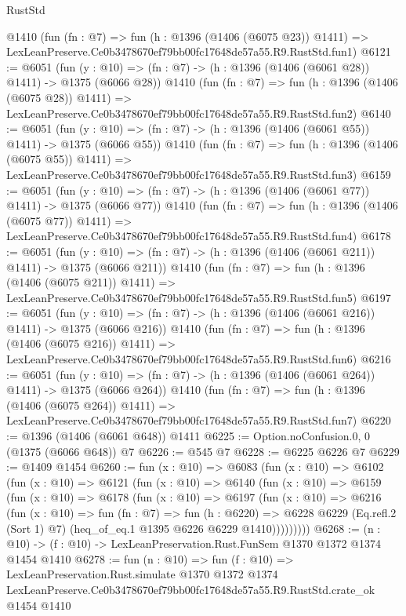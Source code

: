 \begin{lexlean}{RustStd}
\begin{coremodule}
    @1410
    (fun (fn : @7) =>
    fun (h : @1396 (@1406 (@6075 @23)) @1411) =>
    LexLeanPreserve.Ce0b3478670ef79bb00fc17648de57a55.R9.RustStd.fun1)
@6121 := @6051
    (fun (y : @10) => (fn : @7) -> (h : @1396 (@1406 (@6061 @28)) @1411) -> @1375 (@6066 @28))
    @1410
    (fun (fn : @7) =>
    fun (h : @1396 (@1406 (@6075 @28)) @1411) =>
    LexLeanPreserve.Ce0b3478670ef79bb00fc17648de57a55.R9.RustStd.fun2)
@6140 := @6051
    (fun (y : @10) => (fn : @7) -> (h : @1396 (@1406 (@6061 @55)) @1411) -> @1375 (@6066 @55))
    @1410
    (fun (fn : @7) =>
    fun (h : @1396 (@1406 (@6075 @55)) @1411) =>
    LexLeanPreserve.Ce0b3478670ef79bb00fc17648de57a55.R9.RustStd.fun3)
@6159 := @6051
    (fun (y : @10) => (fn : @7) -> (h : @1396 (@1406 (@6061 @77)) @1411) -> @1375 (@6066 @77))
    @1410
    (fun (fn : @7) =>
    fun (h : @1396 (@1406 (@6075 @77)) @1411) =>
    LexLeanPreserve.Ce0b3478670ef79bb00fc17648de57a55.R9.RustStd.fun4)
@6178 := @6051
    (fun (y : @10) => (fn : @7) -> (h : @1396 (@1406 (@6061 @211)) @1411) -> @1375 (@6066 @211))
    @1410
    (fun (fn : @7) =>
    fun (h : @1396 (@1406 (@6075 @211)) @1411) =>
    LexLeanPreserve.Ce0b3478670ef79bb00fc17648de57a55.R9.RustStd.fun5)
@6197 := @6051
    (fun (y : @10) => (fn : @7) -> (h : @1396 (@1406 (@6061 @216)) @1411) -> @1375 (@6066 @216))
    @1410
    (fun (fn : @7) =>
    fun (h : @1396 (@1406 (@6075 @216)) @1411) =>
    LexLeanPreserve.Ce0b3478670ef79bb00fc17648de57a55.R9.RustStd.fun6)
@6216 := @6051
    (fun (y : @10) => (fn : @7) -> (h : @1396 (@1406 (@6061 @264)) @1411) -> @1375 (@6066 @264))
    @1410
    (fun (fn : @7) =>
    fun (h : @1396 (@1406 (@6075 @264)) @1411) =>
    LexLeanPreserve.Ce0b3478670ef79bb00fc17648de57a55.R9.RustStd.fun7)
@6220 := @1396 (@1406 (@6061 @648)) @1411
@6225 := Option.noConfusion.{0, 0} (@1375 (@6066 @648)) @7
@6226 := @545 @7
@6228 := @6225 @6226 @7
@6229 := @1409 @1454
@6260 := fun (x : @10) =>
  @6083
    (fun (x : @10) =>
    @6102
      (fun (x : @10) =>
      @6121
        (fun (x : @10) =>
        @6140
          (fun (x : @10) =>
          @6159
            (fun (x : @10) =>
            @6178
              (fun (x : @10) =>
              @6197
                (fun (x : @10) =>
                @6216
                  (fun (x : @10) =>
                  fun (fn : @7) =>
                  fun (h : @6220) =>
                  @6228
                    @6229
                    (Eq.refl.{2} (Sort 1) @7)
                    (heq_of_eq.{1} @1395 @6226 @6229 @1410)))))))))
@6268 := (n : @10) -> (f : @10) -> LexLeanPreservation.Rust.FunSem @1370 @1372 @1374 @1454 @1410
@6278 := fun (n : @10) =>
  fun (f : @10) =>
  LexLeanPreservation.Rust.simulate
    @1370
    @1372
    @1374
    LexLeanPreserve.Ce0b3478670ef79bb00fc17648de57a55.R9.RustStd.crate_ok
    @1454
    @1410
\end{coremodule}
\end{lexlean}
